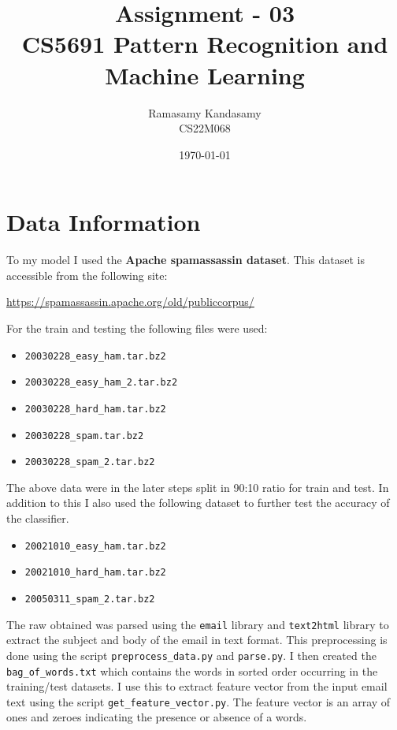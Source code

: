 


\title{Assignment - 03\\ CS5691 Pattern Recognition and Machine Learning}
\author{Ramasamy Kandasamy\\ CS22M068}
\date{\today}


\maketitle

\section*{Data Information}

To my model I used the \textbf{Apache spamassassin dataset}. This dataset is accessible from the following site:

\url{https://spamassassin.apache.org/old/publiccorpus/}

For the train and testing the following files were used:
\begin{itemize}
\item \texttt{20030228\_easy\_ham.tar.bz2}
\item \texttt{20030228\_easy\_ham\_2.tar.bz2}
\item \texttt{20030228\_hard\_ham.tar.bz2}
\item \texttt{20030228\_spam.tar.bz2}
\item \texttt{20030228\_spam\_2.tar.bz2}
\end{itemize}

The above data were in the later steps split in 90:10 ratio for train and test. In addition to this I also used the following dataset to further test the accuracy of the classifier.


\begin{itemize}
\item \texttt{20021010\_easy\_ham.tar.bz2}
\item \texttt{20021010\_hard\_ham.tar.bz2}
\item \texttt{20050311\_spam\_2.tar.bz2}
\end{itemize}

The raw obtained was parsed using the \texttt{email} library and \texttt{text2html} library to extract the subject and body of the email in text format. This preprocessing is done using the script \texttt{preprocess\_data.py} and \texttt{parse.py}. I then created the \texttt{bag\_of\_words.txt} which contains the words in sorted order occurring  in the training/test datasets. I use this to extract feature vector from the input email text using the script \texttt{get\_feature\_vector.py}. The feature vector is an array of ones and zeroes indicating the presence or absence of a words.

